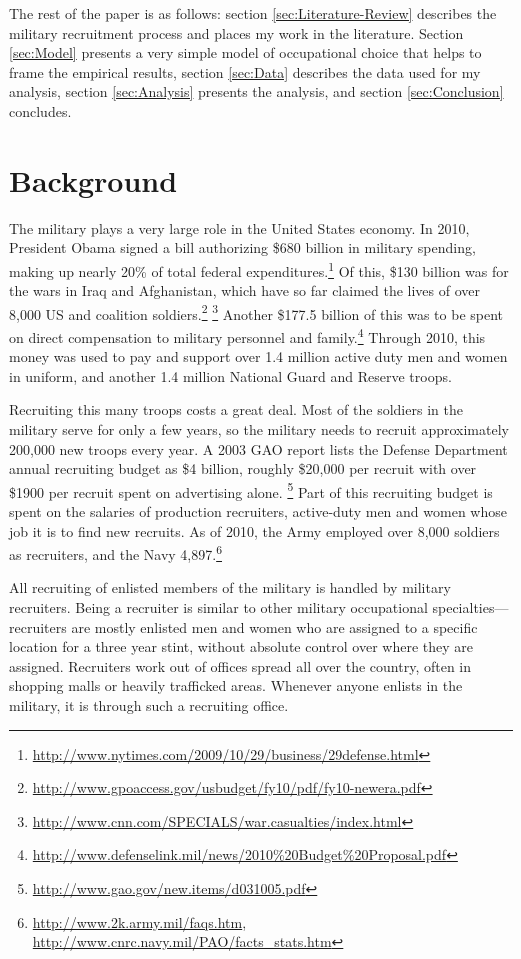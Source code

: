 \documentclass[12pt] {article}
\begin{document}
The rest of the paper is as follows: section \ref{sec:Literature-Review} describes the military
recruitment process and places my work in the literature. Section
\ref{sec:Model} presents a very simple model of occupational choice
that helps to frame the empirical results, section \ref{sec:Data} describes the
data used for my analysis, section \ref{sec:Analysis} presents the analysis, and section
\ref{sec:Conclusion} concludes.



\section{Background\label{sec:Literature-Review}}
The military plays a very large role in the United States economy.
In 2010, President Obama signed a bill authorizing \$680 billion in
military spending, making up nearly 20\% of total federal expenditures.\footnote{\url{http://www.nytimes.com/2009/10/29/business/29defense.html}} Of this, \$130 billion was for the wars in Iraq and Afghanistan, which have so far claimed the lives of over 8,000 US and coalition
soldiers.\footnote{\url{http://www.gpoaccess.gov/usbudget/fy10/pdf/fy10-newera.pdf}}
\footnote{\url{http://www.cnn.com/SPECIALS/war.casualties/index.html}
} Another \$177.5 billion of this was to be spent on direct compensation
to military personnel and family.\footnote{\url{http://www.defenselink.mil/news/2010\%20Budget\%20Proposal.pdf}} Through 2010, this money was used to pay and support over
1.4 million active duty men and women in uniform, and another 1.4
million National Guard and Reserve troops. 

Recruiting this many troops costs a great deal. Most of the soldiers
in the military serve for only a few years, so the military needs
to recruit approximately 200,000 new troops every year. A 2003 GAO
report lists the Defense Department annual recruiting budget as \$4
billion, roughly \$20,000 per recruit with over \$1900 per recruit
spent on advertising alone.%
\footnote{\url{http://www.gao.gov/new.items/d031005.pdf}
} Part of this recruiting budget is spent on the salaries of production
recruiters, active-duty men and women whose job it is to find new
recruits. As of 2010, the Army employed over 8,000 soldiers as recruiters,
and the Navy 4,897.\footnote{\url{http://www.2k.army.mil/faqs.htm}, \url{http://www.cnrc.navy.mil/PAO/facts\_stats.htm}
} 


All recruiting of enlisted members of the military is handled by military
recruiters. Being a recruiter is similar to other military occupational
specialties---recruiters are mostly enlisted men and women who are
assigned to a specific location for a three year stint, without absolute
control over where they are assigned. Recruiters work out of offices
spread all over the country, often in shopping malls or heavily trafficked
areas. Whenever anyone enlists in the military, it is through such
a recruiting office.
\end{document}
